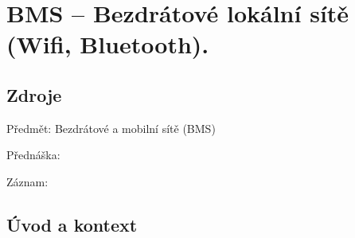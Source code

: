 

\chapter{BMS -- Bezdrátové lokální sítě (Wifi, Bluetooth).}



\section{Zdroje}

\begin{compactitem}
    \item Předmět: Bezdrátové a mobilní sítě (BMS)
    \item Přednáška:
    \begin{compactitem}
        \item {}
    \end{compactitem}
    \item Záznam:
    \begin{compactitem}
        \item {}
    \end{compactitem}
\end{compactitem}


\section{Úvod a kontext}


